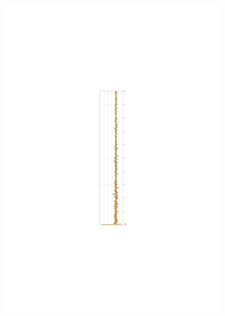 \begin{figure}[htbp]
    \centering
    \includegraphics[scale=0.1]{fig/Capitulo5/Caso_de_estudio_IMU/data/simulated/bias.pdf}
    \vspace{0.5cm}

\end{figure}
